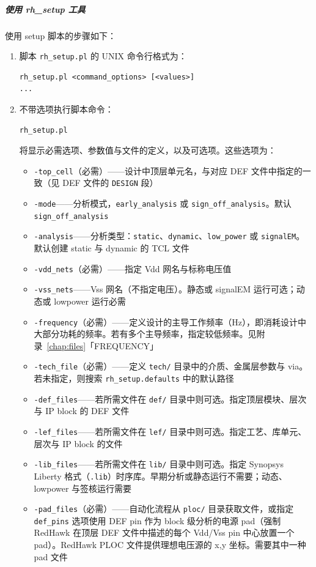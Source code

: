 \subparagraph{使用 rh\_setup 工具}
使用 setup 脚本的步骤如下：

\begin{enumerate}
  \item 脚本 \texttt{rh\_setup.pl} 的 UNIX 命令行格式为：
\begin{lstlisting}
rh_setup.pl <command_options> [<values>]
...
\end{lstlisting}
  \item 不带选项执行脚本命令：
\begin{lstlisting}
rh_setup.pl
\end{lstlisting}
  将显示必需选项、参数值与文件的定义，以及可选项。这些选项为：
  \begin{itemize}
    \item \texttt{-top\_cell}（必需）——设计中顶层单元名，与对应 DEF 文件中指定的一致（见 DEF 文件的 \texttt{DESIGN} 段）
    \item \texttt{-mode}——分析模式，\texttt{early\_analysis} 或 \texttt{sign\_off\_analysis}。默认 \texttt{sign\_off\_analysis}
    \item \texttt{-analysis}——分析类型：\texttt{static}、\texttt{dynamic}、\texttt{low\_power} 或 \texttt{signalEM}。默认创建 static 与 dynamic 的 TCL 文件
    \item \texttt{-vdd\_nets}（必需）——指定 Vdd 网名与标称电压值
    \item \texttt{-vss\_nets}——Vss 网名（不指定电压）。静态或 signalEM 运行可选；动态或 lowpower 运行必需
    \item \texttt{-frequency}（必需）——定义设计的主导工作频率（Hz），即消耗设计中大部分功耗的频率。若有多个主导频率，指定较低频率。见附录~\ref{chap:files}「FREQUENCY」
    \item \texttt{-tech\_file}（必需）——定义 \texttt{tech/} 目录中的介质、金属层参数与 via。若未指定，则搜索 \texttt{rh\_setup.defaults} 中的默认路径
    \item \texttt{-def\_files}——若所需文件在 \texttt{def/} 目录中则可选。指定顶层模块、层次与 IP block 的 DEF 文件
    \item \texttt{-lef\_files}——若所需文件在 \texttt{lef/} 目录中则可选。指定工艺、库单元、层次与 IP block 的文件
    \item \texttt{-lib\_files}——若所需文件在 \texttt{lib/} 目录中则可选。指定 Synopsys Liberty 格式（\texttt{.lib}）时序库。早期分析或静态运行不需要；动态、lowpower 与签核运行需要
    \item \texttt{-pad\_files}（必需）——自动化流程从 \texttt{ploc/} 目录获取文件，或指定 \texttt{def\_pins} 选项使用 DEF pin 作为 block 级分析的电源 pad（强制 RedHawk 在顶层 DEF 文件中描述的每个 Vdd/Vss pin 中心放置一个 pad）。RedHawk PLOC 文件提供理想电压源的 x,y 坐标。需要其中一种 pad 文件

\end{itemize}
\end{enumerate}
